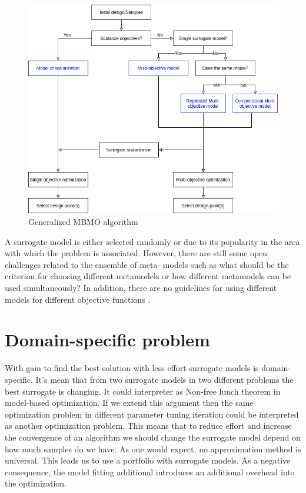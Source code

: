         \begin{figure}
            \centering
            \includegraphics[width=\textwidth]{content/images/mbmo.png}
            \caption[Generalized MBMO algorithm]{Generalized MBMO algorithm}
            \label{fig:generalMBMO}
        \end{figure}


        A surrogate model is either selected randomly or due to its popularity in the area with which the problem is associated.  However, there are still some open challenges related to the ensemble of meta- models such as what should be the criterion for choosing different metamodels or how different metamodels can be used simultaneously? In addition, there are no guidelines for using different models for different objective functions \cite{SoftSurvey}.

    \section{Domain-specific problem}
    With gain to find the best solution with less effort surrogate models is domain-specific. It's mean that from two surrogate models in two different problems the best surrogate is changing. It could interpreter as Non-free lunch theorem in model-based optimization. If we extend this argument then the same optimization problem in different parameter tuning iteration could be interpreted as another optimization problem. This means that to reduce effort and increase the convergence of an algorithm we should change the surrogate model depend on how much samples do we have. As one would expect, no approximation method is universal.
    This leads us to use a portfolio with surrogate models. As a negative consequence, the model fitting additional introduces an additional overhead into the optimization.
    

